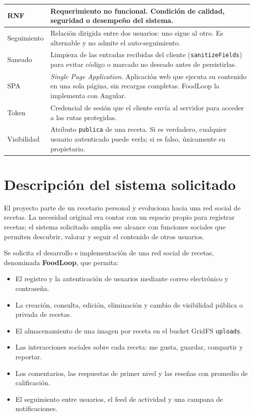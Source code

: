 \documentclass[doc,12pt,a4paper]{apa7}
\begin{document}
\begin{longtable}{|P{3.3cm}|L{11.2cm}|}
RNF & Requerimiento no funcional. Condición de calidad, seguridad o desempeño del sistema. \\ \hline

Seguimiento & Relación dirigida entre dos usuarios: uno sigue al otro. Es alternable y no admite el auto-seguimiento. \\ \hline

Saneado & Limpieza de las entradas recibidas del cliente (\texttt{sanitizeFields}) para evitar código o marcado no deseado antes de persistirlas. \\ \hline

SPA & \textit{Single Page Application}. Aplicación web que ejecuta su contenido en una sola página, sin recargas completas. FoodLoop la implementa con Angular. \\ \hline

Token & Credencial de sesión que el cliente envía al servidor para acceder a las rutas protegidas. \\ \hline

Visibilidad & Atributo \texttt{publica} de una receta. Si es verdadero, cualquier usuario autenticado puede verla; si es falso, únicamente su propietario. \\ \hline

\end{longtable}

\section{Descripción del sistema solicitado}

El proyecto parte de un recetario personal y evoluciona hacia una red social de recetas. La necesidad original era contar con un espacio propio para registrar recetas; el sistema solicitado amplía ese alcance con funciones sociales que permiten descubrir, valorar y seguir el contenido de otros usuarios.

Se solicita el desarrollo e implementación de una red social de recetas, denominada \textbf{FoodLoop}, que permita:

\begin{itemize}
    \item El registro y la autenticación de usuarios mediante correo electrónico y contraseña.
    \item La creación, consulta, edición, eliminación y cambio de visibilidad pública o privada de recetas.
    \item El almacenamiento de una imagen por receta en el bucket GridFS \texttt{uploads}.
    \item Las interacciones sociales sobre cada receta: me gusta, guardar, compartir y reportar.
    \item Los comentarios, las respuestas de primer nivel y las reseñas con promedio de calificación.
    \item El seguimiento entre usuarios, el feed de actividad y una campana de notificaciones.
\end{itemize}
\end{document}

